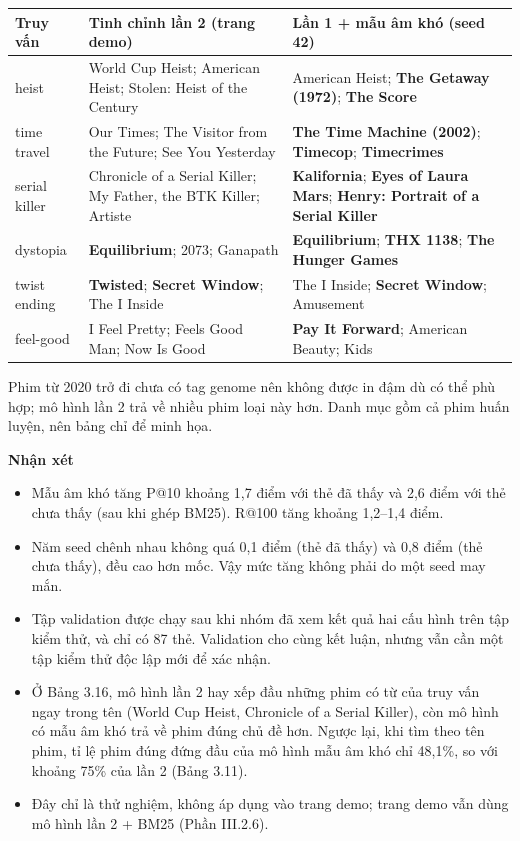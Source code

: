 \documentclass[12pt,a4paper]{article}
\providecommand{\tightlist}{\setlength{\itemsep}{0pt}\setlength{\parskip}{0pt}}
\newcommand{\lbl}[1]{\Needspace{6\baselineskip}\textbf{#1}\par\nopagebreak}
\begin{document}
{\def\LTcaptype{}\small
\begin{longtable}[]{@{}*{3}{P{(\linewidth - 4\tabcolsep) * }}@{}}
\toprule
\textbf{Truy vấn} & \textbf{Tinh chỉnh lần 2 (trang demo)} & \textbf{Lần 1 + mẫu âm khó (seed 42)} \\
\midrule
\endhead
\bottomrule
\endlastfoot
heist & World Cup Heist; American Heist; Stolen: Heist of the Century & American Heist; \textbf{The Getaway (1972)}; \textbf{The Score} \\
time travel & Our Times; The Visitor from the Future; See You Yesterday & \textbf{The Time Machine (2002)}; \textbf{Timecop}; \textbf{Timecrimes} \\
serial killer & Chronicle of a Serial Killer; My Father, the BTK Killer; Artiste & \textbf{Kalifornia}; \textbf{Eyes of Laura Mars}; \textbf{Henry: Portrait of a Serial Killer} \\
dystopia & \textbf{Equilibrium}; 2073; Ganapath & \textbf{Equilibrium}; \textbf{THX 1138}; \textbf{The Hunger Games} \\
twist ending & \textbf{Twisted}; \textbf{Secret Window}; The I Inside & The I Inside; \textbf{Secret Window}; Amusement \\*
feel-good & I Feel Pretty; Feels Good Man; Now Is Good & \textbf{Pay It Forward}; American Beauty; Kids \\
\end{longtable}
}

Phim từ 2020 trở đi chưa có tag genome nên không được in đậm dù có thể phù hợp; mô hình lần 2 trả về nhiều phim loại này hơn. Danh mục gồm cả phim huấn luyện, nên bảng chỉ để minh họa.

\lbl{Nhận xét}

\begin{itemize}
\tightlist
\item Mẫu âm khó tăng P@10 khoảng 1,7 điểm với thẻ đã thấy và 2,6 điểm với thẻ chưa thấy (sau khi ghép BM25). R@100 tăng khoảng 1,2--1,4 điểm.
\item Năm seed chênh nhau không quá 0,1 điểm (thẻ đã thấy) và 0,8 điểm (thẻ chưa thấy), đều cao hơn mốc. Vậy mức tăng không phải do một seed may mắn.
\item Tập validation được chạy sau khi nhóm đã xem kết quả hai cấu hình trên tập kiểm thử, và chỉ có 87 thẻ. Validation cho cùng kết luận, nhưng vẫn cần một tập kiểm thử độc lập mới để xác nhận.
\item Ở Bảng 3.16, mô hình lần 2 hay xếp đầu những phim có từ của truy vấn ngay trong tên (World Cup Heist, Chronicle of a Serial Killer), còn mô hình có mẫu âm khó trả về phim đúng chủ đề hơn. Ngược lại, khi tìm theo tên phim, tỉ lệ phim đúng đứng đầu của mô hình mẫu âm khó chỉ 48,1\%, so với khoảng 75\% của lần 2 (Bảng 3.11).
\item Đây chỉ là thử nghiệm, không áp dụng vào trang demo; trang demo vẫn dùng mô hình lần 2 + BM25 (Phần III.2.6).
\end{itemize}
\end{document}
